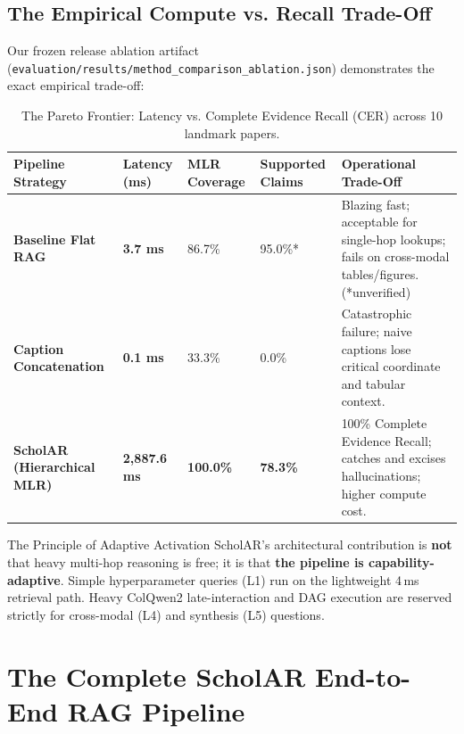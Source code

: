 \documentclass[11pt,a4paper]{article}
\begin{document}
\subsection{The Empirical Compute vs. Recall Trade-Off}
Our frozen release ablation artifact (\texttt{evaluation/results/method\_comparison\_ablation.json}) demonstrates the exact empirical trade-off:
\begin{table}[h]
\centering
\small
\begin{tabularx}{\textwidth}{lXXXX}
\toprule
\textbf{Pipeline Strategy} & \textbf{Latency (ms)} & \textbf{MLR Coverage} & \textbf{Supported Claims} & \textbf{Operational Trade-Off} \\
\midrule
\textbf{Baseline Flat RAG} & \textbf{3.7 ms} & 86.7\% & 95.0\%* & Blazing fast; acceptable for single-hop lookups; fails on cross-modal tables/figures. (*unverified) \\
\textbf{Caption Concatenation} & \textbf{0.1 ms} & 33.3\% & 0.0\% & Catastrophic failure; naive captions lose critical coordinate and tabular context. \\
\textbf{ScholAR (Hierarchical MLR)} & \textbf{2,887.6 ms} & \textbf{100.0\%} & \textbf{78.3\%} & 100\% Complete Evidence Recall; catches and excises hallucinations; higher compute cost. \\
\bottomrule
\end{tabularx}
\caption{The Pareto Frontier: Latency vs. Complete Evidence Recall (CER) across 10 landmark papers.}
\end{table}

\begin{keytakeaway}{The Principle of Adaptive Activation}
ScholAR's architectural contribution is \textbf{not} that heavy multi-hop reasoning is free; it is that \textbf{the pipeline is capability-adaptive}. Simple hyperparameter queries (L1) run on the lightweight 4\,ms retrieval path. Heavy ColQwen2 late-interaction and DAG execution are reserved strictly for cross-modal (L4) and synthesis (L5) questions.
\end{keytakeaway}

\vspace{10pt}

\section{The Complete ScholAR End-to-End RAG Pipeline}
\end{document}
